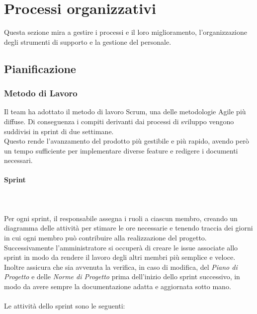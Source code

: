 \section{Processi organizzativi}
Questa sezione mira a gestire i processi e il loro miglioramento,
l'organizzazione degli strumenti di supporto e la gestione del personale.

\subsection{Pianificazione}
\subsubsection{Metodo di Lavoro}
Il team ha adottato il metodo di lavoro Scrum, una delle metodologie Agile più
diffuse. Di conseguenza i compiti derivanti dai
processi di sviluppo vengono suddivisi in sprint di
due settimane.\\ Questo rende l'avanzamento del prodotto più gestibile e più
rapido, avendo però un tempo sufficiente per implementare diverse
feature e redigere i documenti necessari. \paragraph*{Sprint}\label{inf:sprint}
~\\\\ Per ogni sprint, il responsabile assegna i ruoli a ciascun membro,
creando un diagramma delle attività per stimare le ore necessarie e tenendo
traccia dei giorni in cui ogni membro può contribuire alla realizzazione del
progetto. Successivamente l'amministratore si occuperà di creare le issue
associate allo sprint in modo da rendere il lavoro degli altri membri più
semplice e veloce. Inoltre assicura che sia avvenuta la verifica, in caso di
modifica, del \textit{Piano di Progetto} e delle \textit{Norme di Progetto}
prima dell'inizio dello sprint successivo, in modo da avere sempre la
documentazione adatta e aggiornata sotto mano.\\\\ Le attività dello sprint
sono le seguenti:
